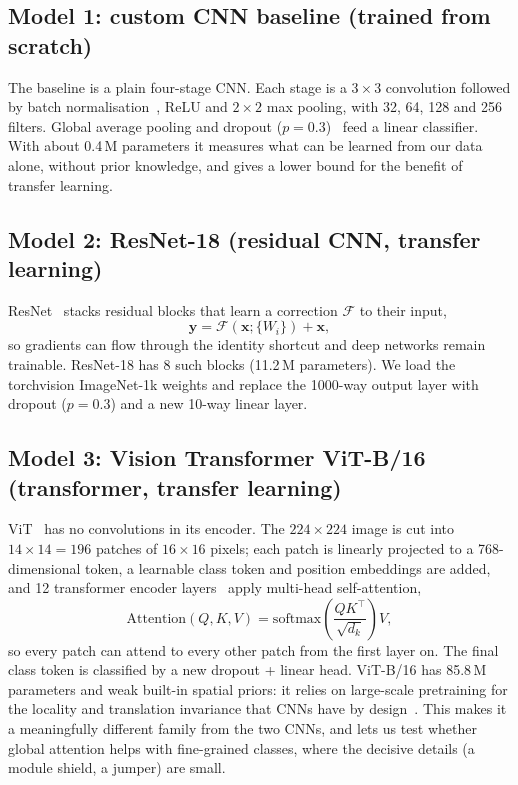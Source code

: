 \documentclass[11pt,a4paper]{article}
\providecommand{\NumClasses}{10}
\begin{document}
\subsection{Model 1: custom CNN baseline (trained from scratch)}
The baseline is a plain four-stage CNN. Each stage is a $3\times3$ convolution followed by batch normalisation~\cite{ioffe2015}, ReLU and $2\times2$ max pooling, with 32, 64, 128 and 256 filters. Global average pooling and dropout ($p=0.3$)~\cite{srivastava2014} feed a linear classifier. With about 0.4\,M parameters it measures what can be learned from our data alone, without prior knowledge, and gives a lower bound for the benefit of transfer learning.

\subsection{Model 2: ResNet-18 (residual CNN, transfer learning)}
ResNet~\cite{he2016} stacks residual blocks that learn a correction $\mathcal{F}$ to their input,
\begin{equation}
  \mathbf{y} = \mathcal{F}(\mathbf{x}; \{W_i\}) + \mathbf{x},
\end{equation}
so gradients can flow through the identity shortcut and deep networks remain trainable. ResNet-18 has 8 such blocks (11.2\,M parameters). We load the torchvision ImageNet-1k weights and replace the 1000-way output layer with dropout ($p=0.3$) and a new \NumClasses-way linear layer.

\subsection{Model 3: Vision Transformer ViT-B/16 (transformer, transfer learning)}
ViT~\cite{dosovitskiy2021} has no convolutions in its encoder. The $224\times224$ image is cut into $14\times14=196$ patches of $16\times16$ pixels; each patch is linearly projected to a 768-dimensional token, a learnable class token and position embeddings are added, and 12 transformer encoder layers~\cite{vaswani2017} apply multi-head self-attention,
\begin{equation}
  \mathrm{Attention}(Q,K,V) = \mathrm{softmax}\!\left(\frac{QK^\top}{\sqrt{d_k}}\right) V,
\end{equation}
so every patch can attend to every other patch from the first layer on. The final class token is classified by a new dropout + linear head. ViT-B/16 has 85.8\,M parameters and weak built-in spatial priors: it relies on large-scale pretraining for the locality and translation invariance that CNNs have by design~\cite{raghu2021}. This makes it a meaningfully different family from the two CNNs, and lets us test whether global attention helps with fine-grained classes, where the decisive details (a module shield, a jumper) are small.
\end{document}
